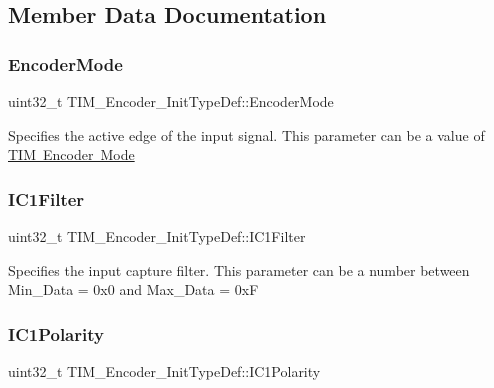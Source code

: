 \subsection{Member Data Documentation}
\mbox{\label{struct_t_i_m___encoder___init_type_def_ab1e4b0752d88c04081e3ff2fea6aa52e}} 
\subsubsection{\texorpdfstring{EncoderMode}{EncoderMode}}
{\footnotesize\ttfamily uint32\+\_\+t T\+I\+M\+\_\+\+Encoder\+\_\+\+Init\+Type\+Def\+::\+Encoder\+Mode}

Specifies the active edge of the input signal. This parameter can be a value of \mbox{\hyperlink{group___t_i_m___encoder___mode}{T\+IM Encoder Mode}} \mbox{\label{struct_t_i_m___encoder___init_type_def_a50f3051c1b568b9dcde146199f97f3fb}} 
\subsubsection{\texorpdfstring{IC1Filter}{IC1Filter}}
{\footnotesize\ttfamily uint32\+\_\+t T\+I\+M\+\_\+\+Encoder\+\_\+\+Init\+Type\+Def\+::\+I\+C1\+Filter}

Specifies the input capture filter. This parameter can be a number between Min\+\_\+\+Data = 0x0 and Max\+\_\+\+Data = 0xF \mbox{\label{struct_t_i_m___encoder___init_type_def_a3e27323d593e4f3b95ebaa3772e79618}} 
\subsubsection{\texorpdfstring{IC1Polarity}{IC1Polarity}}
{\footnotesize\ttfamily uint32\+\_\+t T\+I\+M\+\_\+\+Encoder\+\_\+\+Init\+Type\+Def\+::\+I\+C1\+Polarity}

